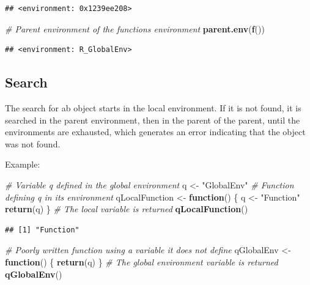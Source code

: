 \documentclass[
  12pt,
  american,
  a4paper,
  extrafontsizes,onecolumn,openright
  ]{memoir}
\newenvironment{Shaded}{\begin{snugshade}}{\end{snugshade}}
\newcommand{\CommentTok}[1]{\textcolor[rgb]{0.56,0.35,0.01}{\textit{#1}}}
\newcommand{\ControlFlowTok}[1]{\textcolor[rgb]{0.13,0.29,0.53}{\textbf{#1}}}
\newcommand{\FunctionTok}[1]{\textcolor[rgb]{0.13,0.29,0.53}{\textbf{#1}}}
\newcommand{\NormalTok}[1]{#1}
\newcommand{\OtherTok}[1]{\textcolor[rgb]{0.56,0.35,0.01}{#1}}
\newcommand{\StringTok}[1]{\textcolor[rgb]{0.31,0.60,0.02}{#1}}
\begin{document}
\begin{verbatim}
## <environment: 0x1239ee208>
\end{verbatim}

\begin{Shaded}
\begin{Highlighting}[]
\CommentTok{\# Parent environment of the function\textquotesingle{}s environment}
\FunctionTok{parent.env}\NormalTok{(}\FunctionTok{f}\NormalTok{())}
\end{Highlighting}
\end{Shaded}

\begin{verbatim}
## <environment: R_GlobalEnv>
\end{verbatim}

\normalsize

\subsection{Search}\label{search}

The search for ab object starts in the local environment.
If it is not found, it is searched in the parent environment, then in the parent of the parent, until the environments are exhausted, which generates an error indicating that the object was not found.

Example:

\scriptsize

\begin{Shaded}
\begin{Highlighting}[]
\CommentTok{\# Variable q defined in the global environment}
\NormalTok{q }\OtherTok{\textless{}{-}} \StringTok{"GlobalEnv"}
\CommentTok{\# Function defining q in its environment}
\NormalTok{qLocalFunction }\OtherTok{\textless{}{-}} \ControlFlowTok{function}\NormalTok{() \{}
\NormalTok{  q }\OtherTok{\textless{}{-}} \StringTok{"Function"}
  \FunctionTok{return}\NormalTok{(q)}
\NormalTok{\}}
\CommentTok{\# The local variable is returned}
\FunctionTok{qLocalFunction}\NormalTok{()}
\end{Highlighting}
\end{Shaded}

\begin{verbatim}
## [1] "Function"
\end{verbatim}

\begin{Shaded}
\begin{Highlighting}[]
\CommentTok{\# Poorly written function using a variable it does not define}
\NormalTok{qGlobalEnv }\OtherTok{\textless{}{-}} \ControlFlowTok{function}\NormalTok{() \{}
   \FunctionTok{return}\NormalTok{(q)}
\NormalTok{\}}
\CommentTok{\# The global environment variable is returned}
\FunctionTok{qGlobalEnv}\NormalTok{()}
\end{Highlighting}
\end{Shaded}
\end{document}
